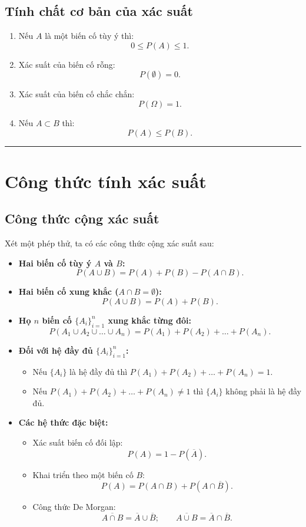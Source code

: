 \subsection{Tính chất cơ bản của xác suất}
\begin{enumerate}[label=\arabic*), leftmargin=1.5em]
    \item Nếu $A$ là một biến cố tùy ý thì:
    \[
    0 \le P(A) \le 1.
    \]
    \item Xác suất của biến cố rỗng:
    \[
    P(\emptyset) = 0.
    \]
    \item Xác suất của biến cố chắc chắn:
    \[
    P(\Omega) = 1.
    \]
    \item Nếu $A \subset B$ thì:
    \[
    P(A) \le P(B).
    \]
\end{enumerate}

\vspace{1em}
\hrule
\vspace{1.5em}

\section{Công thức tính xác suất}

\subsection{Công thức cộng xác suất}
Xét một phép thử, ta có các công thức cộng xác suất sau:
\begin{itemize}[leftmargin=1.5em]
    \item \textbf{Hai biến cố tùy ý $A$ và $B$:}
    \[
    P(A \cup B) = P(A) + P(B) - P(A \cap B).
    \]
    \item \textbf{Hai biến cố xung khắc ($A \cap B = \emptyset$):}
    \[
    P(A \cup B) = P(A) + P(B).
    \]
    \item \textbf{Họ $n$ biến cố $\{A_i\}_{i=1}^n$ xung khắc từng đôi:}
    \[
    P(A_1 \cup A_2 \cup \dots \cup A_n) = P(A_1) + P(A_2) + \dots + P(A_n).
    \]
    \item \textbf{Đối với hệ đầy đủ $\{A_i\}_{i=1}^n$:}
    \begin{itemize}
        \item Nếu $\{A_i\}$ là hệ đầy đủ thì $P(A_1) + P(A_2) + \dots + P(A_n) = 1$.
        \item Nếu $P(A_1) + P(A_2) + \dots + P(A_n) \ne 1$ thì $\{A_i\}$ không phải là hệ đầy đủ.
    \end{itemize}
    \item \textbf{Các hệ thức đặc biệt:}
    \begin{itemize}
        \item Xác suất biến cố đối lập:
        \[
        P(A) = 1 - P(\overline{A}).
        \]
        \item Khai triển theo một biến cố $B$:
        \[
        P(A) = P(A \cap B) + P(A \cap \overline{B}).
        \]
        \item Công thức De Morgan:
        \[
        \overline{A \cap B} = \overline{A} \cup \overline{B}; \qquad \overline{A \cup B} = \overline{A} \cap \overline{B}.
        \]
    \end{itemize}
\end{itemize}

